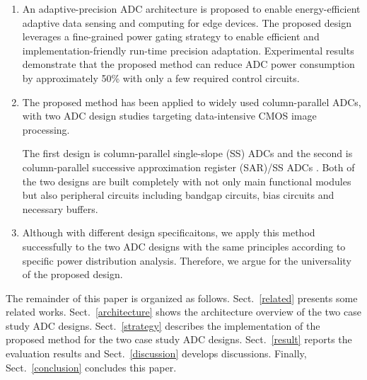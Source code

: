 \begin{enumerate}[\IEEEsetlabelwidth{3)}]
	\item 
	An adaptive-precision ADC architecture is proposed to enable energy-efficient adaptive data sensing and computing for edge devices. The proposed design leverages a fine-grained power gating strategy to enable efficient and implementation-friendly run-time precision adaptation.
	Experimental results demonstrate that the proposed method can reduce ADC power consumption by approximately 50\% with only a few required control circuits.
	\item 
	The proposed method has been applied to widely used column-parallel ADCs, with two ADC design studies targeting data-intensive CMOS image processing.
	
	The first design is column-parallel single-slope (SS) ADCs \cite{snoeij_18v_2005}\cite{kleinfelder_10000_2001} and the second is column-parallel successive approximation register (SAR)/SS ADCs \cite{kim_area-efficient_2016}.
	Both of the two designs are built completely with not only main functional modules but also peripheral circuits including bandgap circuits, bias circuits and necessary buffers.
	\item 
	Although with different design specificaitons, we apply this method successfully to the two ADC designs with the same principles according to specific power distribution analysis.
	Therefore, we argue for the universality of the proposed design.
\end{enumerate} 

The remainder of this paper is organized as follows. 
Sect.~\ref{related} presents some related works.
Sect.~\ref{architecture} shows the architecture overview of the two case study ADC designs. 
Sect.~\ref{strategy} describes the implementation of the proposed method for the two case study ADC designs. 
Sect.~\ref{result} reports the evaluation results and Sect.~\ref{discussion} develops discussions. 
Finally, Sect.~\ref{conclusion} concludes this paper.
